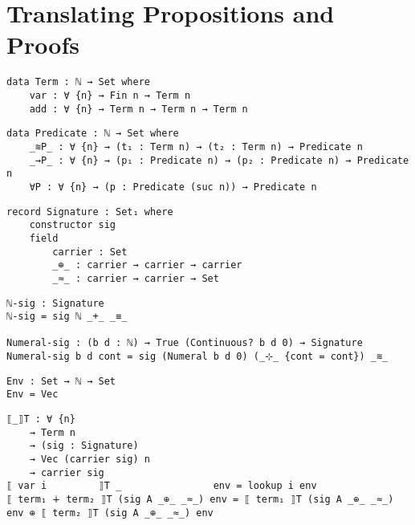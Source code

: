 \documentclass[\main/thesis.tex]{subfiles}
\begin{document}
\chapter{Translating Propositions and Proofs}\label{translation}



\begin{lstlisting}
data Term : ℕ → Set where
    var : ∀ {n} → Fin n → Term n
    add : ∀ {n} → Term n → Term n → Term n
\end{lstlisting}

\begin{lstlisting}
data Predicate : ℕ → Set where
    _≋P_ : ∀ {n} → (t₁ : Term n) → (t₂ : Term n) → Predicate n
    _→P_ : ∀ {n} → (p₁ : Predicate n) → (p₂ : Predicate n) → Predicate n
    ∀P : ∀ {n} → (p : Predicate (suc n)) → Predicate n
\end{lstlisting}

\begin{lstlisting}
record Signature : Set₁ where
    constructor sig
    field
        carrier : Set
        _⊕_ : carrier → carrier → carrier
        _≈_ : carrier → carrier → Set
\end{lstlisting}


\begin{lstlisting}
ℕ-sig : Signature
ℕ-sig = sig ℕ _+_ _≡_

Numeral-sig : (b d : ℕ) → True (Continuous? b d 0) → Signature
Numeral-sig b d cont = sig (Numeral b d 0) (_⊹_ {cont = cont}) _≋_
\end{lstlisting}



\begin{lstlisting}
Env : Set → ℕ → Set
Env = Vec
\end{lstlisting}

\begin{lstlisting}
⟦_⟧T : ∀ {n}
    → Term n
    → (sig : Signature)
    → Vec (carrier sig) n
    → carrier sig
⟦ var i         ⟧T _                env = lookup i env
⟦ term₁ ∔ term₂ ⟧T (sig A _⊕_ _≈_) env = ⟦ term₁ ⟧T (sig A _⊕_ _≈_) env ⊕ ⟦ term₂ ⟧T (sig A _⊕_ _≈_) env
\end{lstlisting}

\begin{lstlisting}
\end{lstlisting}
\end{document}
